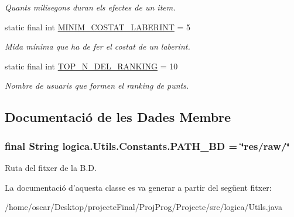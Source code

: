 \begin{DoxyCompactItemize}
\begin{DoxyCompactList}\small\item\em Quants milisegons duran els efectes de un item. \end{DoxyCompactList}\item 
\hypertarget{classlogica_1_1_utils_1_1_constants_af0255617e604b0757200f05de64fa934}{static final int \hyperlink{classlogica_1_1_utils_1_1_constants_af0255617e604b0757200f05de64fa934}{M\+I\+N\+I\+M\+\_\+\+C\+O\+S\+T\+A\+T\+\_\+\+L\+A\+B\+E\+R\+I\+N\+T} = 5}\label{classlogica_1_1_utils_1_1_constants_af0255617e604b0757200f05de64fa934}

\begin{DoxyCompactList}\small\item\em Mida mínima que ha de fer el costat de un laberint. \end{DoxyCompactList}\item 
\hypertarget{classlogica_1_1_utils_1_1_constants_a0fd652b6e00ec4f847dbfd8a18b27384}{static final int \hyperlink{classlogica_1_1_utils_1_1_constants_a0fd652b6e00ec4f847dbfd8a18b27384}{T\+O\+P\+\_\+\+N\+\_\+\+D\+E\+L\+\_\+\+R\+A\+N\+K\+I\+N\+G} = 10}\label{classlogica_1_1_utils_1_1_constants_a0fd652b6e00ec4f847dbfd8a18b27384}

\begin{DoxyCompactList}\small\item\em Nombre de usuaris que formen el ranking de punts. \end{DoxyCompactList}\end{DoxyCompactItemize}


\subsection{Documentació de les Dades Membre}
\hypertarget{classlogica_1_1_utils_1_1_constants_a93e52fcb78172fbc1fb7b9b03ac68140}{
\subsubsection[{P\+A\+T\+H\+\_\+\+B\+D}]{\setlength{\rightskip}{0pt plus 5cm}final String logica.\+Utils.\+Constants.\+P\+A\+T\+H\+\_\+\+B\+D = \char`\"{}res/raw/\char`\"{}\hspace{0.3cm}{\ttfamily [static]}}}\label{classlogica_1_1_utils_1_1_constants_a93e52fcb78172fbc1fb7b9b03ac68140}


Ruta del fitxer de la B.\+D. 



La documentació d'aquesta classe es va generar a partir del següent fitxer\+:\begin{DoxyCompactItemize}
\item 
/home/oscar/\+Desktop/projecte\+Final/\+Proj\+Prog/\+Projecte/src/logica/Utils.\+java\end{DoxyCompactItemize}
